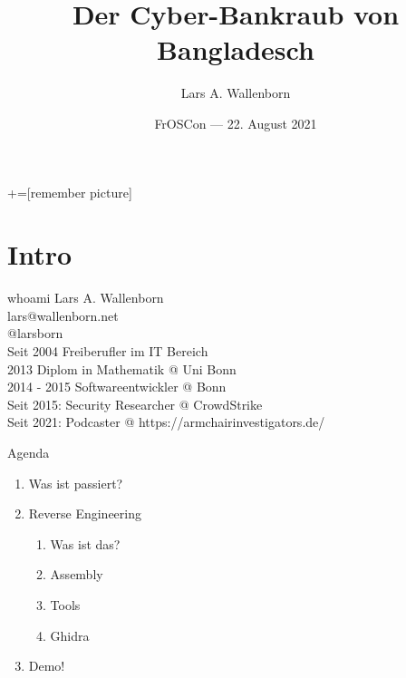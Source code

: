 \documentclass[aspectratio=169,handout]{beamer}
\title{Der Cyber-Bankraub von Bangladesch}
\date{FrOSCon --- 22. August 2021}
\author{Lars A. Wallenborn}
\institute{Mit Malware Analyse Großkriminellen auf die Spur kommen}
\begin{document}
+=[remember picture]

\maketitle
\section{Intro}
\begin{frame}{whoami}
  Lars A. Wallenborn\\
  lars@wallenborn.net\\
  @larsborn\\
  \vspace{1cm}
  Seit 2004 Freiberufler im IT Bereich\\
  2013 Diplom in Mathematik @ Uni Bonn\\
  2014 - 2015 Softwareentwickler @ Bonn\\
  Seit 2015: Security Researcher @ CrowdStrike\\
  Seit 2021: Podcaster @ https://armchairinvestigators.de/
\end{frame}

\begin{frame}{Agenda}
  \begin{enumerate}
    \item Was ist passiert?
    \item Reverse Engineering
      \begin{enumerate}
        \item Was ist das?
        \item Assembly
        \item Tools
        \item Ghidra
      \end{enumerate}
    \item Demo!
  \end{enumerate}
\end{frame}

\newcommand{\fullslide}[3]{\begin{frame}[plain]
  \begin{tikzpicture}[remember picture,overlay]
  \node[at=(current page.center)]{
    \texttt{[image: images/\#1]}
    };
    \pgfsetfillopacity{0.7}
    \node[at=(current page.center)]{
      \begin{beamercolorbox}[sep=0.5cm,wd=.7\paperwidth]{title}%
        \centering
        \pgfsetfillopacity{1}%
        \LARGE
        #3
      \end{beamercolorbox}
    };
    \node[anchor=south east, at=(current page.south east), text=white]{\pgfsetfillopacity{0.8}\tiny Quelle: #2};
  \end{tikzpicture}
\end{frame}}
\end{document}
